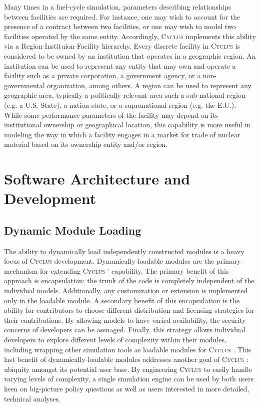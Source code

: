 \documentclass{anstrans}
\newcommand{\Cyclus}{\textsc{Cyclus }}
\begin{document}
Many times in a fuel-cycle simulation, parameters describing
relationships between facilities are required. For instance, one may
wish to account for the presence of a contract between two facilities,
or one may wish to model two facilities operated by the same
entity. Accordingly, \Cyclus implements this ability via a
Region-Instituion-Facility hierarchy. Every discrete facility in
\Cyclus is considered to be owned by an institution that operates in a
geographic region.  An institution can be used to represent any entity
that may own and operate a facility such as a private corporation, a
government agency, or a non-governmental organization, among others.
A region can be used to represent any geographic area, typically a
politically relevant area such a sub-national region (e.g. a
U.S. State), a nation-state, or a supranational
region (e.g. the E.U.).  While some performance parameters of the
facility may depend on its institutional ownership or geographical
location, this capability is more useful in modeling the way in which
a facility engages in a market for trade of nuclear material based on
its ownership entity and/or region.


\section{Software Architecture and Development}

\subsection{Dynamic Module Loading}

The ability to dynamically load independently constructed modules is a
heavy focus of \Cyclus development. Dynamically-loadable modules are
the primary mechanism for extending \Cyclus' capability. The primary
benefit of this approach is encapsulation: the trunk of the code is
completely independent of the individual models. Additionally, any
customization or extension is implemented only in the loadable
module. A secondary benefit of this encapsulation is the ability for
contributors to choose different distribution and licensing strategies
for their contributions. By allowing models to have varied
availability, the security concerns of developers can be
assuaged. Finally, this strategy allows individual developers to
explore different levels of complexity within their modules, including
wrapping other simulation tools as loadable modules for \Cyclus. This
last benefit of dynamically-loadable modules addresses another goal of
\Cyclus: ubiquity amongst its potential user base. By engineering
\Cyclus to easily handle varying levels of complexity, a single
simulation engine can be used by both users keen on big-picture policy
questions as well as users interested in more detailed, technical
analyses.
\end{document}
